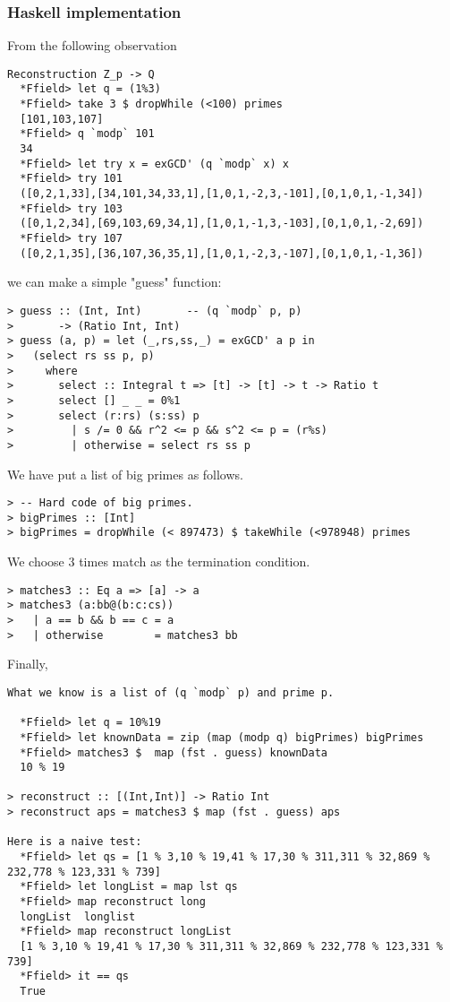 \documentclass[11pt]{book}
\begin{document}
\subsubsection{Haskell implementation}
From the following observation
\begin{verbatim}
Reconstruction Z_p -> Q
  *Ffield> let q = (1%3)
  *Ffield> take 3 $ dropWhile (<100) primes
  [101,103,107]
  *Ffield> q `modp` 101
  34
  *Ffield> let try x = exGCD' (q `modp` x) x
  *Ffield> try 101
  ([0,2,1,33],[34,101,34,33,1],[1,0,1,-2,3,-101],[0,1,0,1,-1,34])
  *Ffield> try 103
  ([0,1,2,34],[69,103,69,34,1],[1,0,1,-1,3,-103],[0,1,0,1,-2,69])
  *Ffield> try 107
  ([0,2,1,35],[36,107,36,35,1],[1,0,1,-2,3,-107],[0,1,0,1,-1,36])  
\end{verbatim}
we can make a simple "guess" function:
\begin{verbatim}
> guess :: (Int, Int)       -- (q `modp` p, p)
>       -> (Ratio Int, Int)
> guess (a, p) = let (_,rs,ss,_) = exGCD' a p in
>   (select rs ss p, p)
>     where
>       select :: Integral t => [t] -> [t] -> t -> Ratio t
>       select [] _ _ = 0%1
>       select (r:rs) (s:ss) p
>         | s /= 0 && r^2 <= p && s^2 <= p = (r%s)
>         | otherwise = select rs ss p
\end{verbatim}
We have put a list of big primes as follows.
\begin{verbatim}
> -- Hard code of big primes.
> bigPrimes :: [Int]
> bigPrimes = dropWhile (< 897473) $ takeWhile (<978948) primes  
\end{verbatim}
We choose 3 times match as the termination condition.
\begin{verbatim}
> matches3 :: Eq a => [a] -> a
> matches3 (a:bb@(b:c:cs))
>   | a == b && b == c = a
>   | otherwise        = matches3 bb
\end{verbatim}
Finally,
\begin{verbatim}
What we know is a list of (q `modp` p) and prime p.

  *Ffield> let q = 10%19
  *Ffield> let knownData = zip (map (modp q) bigPrimes) bigPrimes  
  *Ffield> matches3 $  map (fst . guess) knownData 
  10 % 19

> reconstruct :: [(Int,Int)] -> Ratio Int
> reconstruct aps = matches3 $ map (fst . guess) aps

Here is a naive test:
  *Ffield> let qs = [1 % 3,10 % 19,41 % 17,30 % 311,311 % 32,869 % 232,778 % 123,331 % 739]
  *Ffield> let longList = map lst qs
  *Ffield> map reconstruct long
  longList  longlist
  *Ffield> map reconstruct longList 
  [1 % 3,10 % 19,41 % 17,30 % 311,311 % 32,869 % 232,778 % 123,331 % 739]
  *Ffield> it == qs
  True
\end{verbatim}
\end{document}

